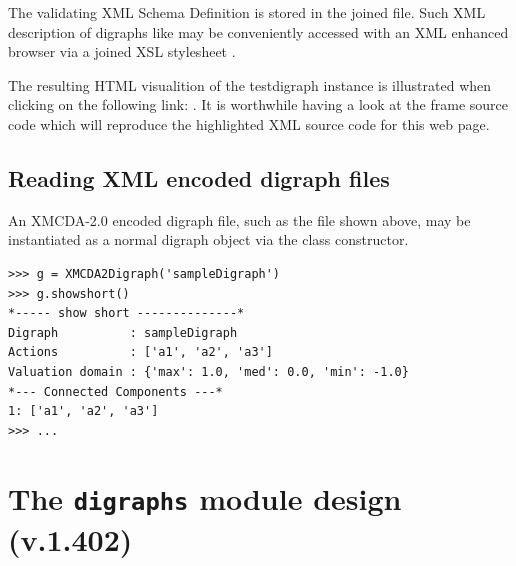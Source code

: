 \documentclass{article}
\newcommand{\+}{\verb+}
\renewcommand{\*}{\back{}}
\newcommand{\Dg}{\texttt{digraphs}\xspace }
\begin{document}
\begin{center}
The validating XML Schema Definition is stored in the joined  file. Such XML description of digraphs like  may be conveniently accessed with an XML enhanced browser via a joined XSL stylesheet .

The resulting HTML visualition of the testdigraph instance is illustrated when clicking on the following link: . It is worthwhile having a look at the frame source code which will reproduce the highlighted XML source code for this web page.

\subsection{Reading XML encoded digraph files}

An XMCDA-2.0 encoded digraph file, such as the  file shown above, may be instantiated as a normal digraph object via the  class constructor.
\begin{example}
\begin{verbatim}
>>> g = XMCDA2Digraph('sampleDigraph')
>>> g.showshort()
*----- show short --------------*
Digraph          : sampleDigraph
Actions          : ['a1', 'a2', 'a3']
Valuation domain : {'max': 1.0, 'med': 0.0, 'min': -1.0}
*--- Connected Components ---*
1: ['a1', 'a2', 'a3']
>>> ...
\end{verbatim}
\end{example} 

\section{The \Dg module design (v.1.402)}
\label{sec:classdesign}


\end{center}
\end{document}
